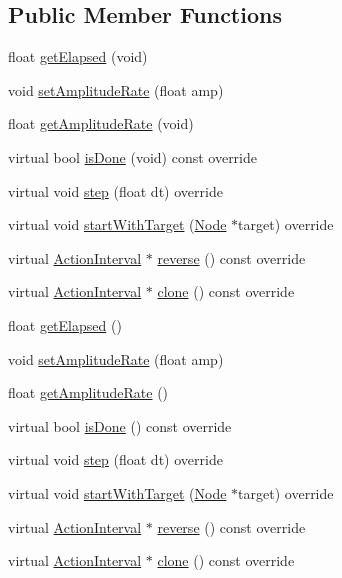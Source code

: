 \subsection*{Public Member Functions}
\begin{DoxyCompactItemize}
\item 
float \hyperlink{classActionInterval_ac4c654318b41a008364a93955a791b96}{get\+Elapsed} (void)
\item 
void \hyperlink{classActionInterval_a08c4d7dd0e8e3fb5e6b6684c6e1d86df}{set\+Amplitude\+Rate} (float amp)
\item 
float \hyperlink{classActionInterval_a376d54a39aef69cb640879c5ce1d589d}{get\+Amplitude\+Rate} (void)
\item 
virtual bool \hyperlink{classActionInterval_a466ff6a3a5f95e47d4d01bfa4775290d}{is\+Done} (void) const override
\item 
virtual void \hyperlink{classActionInterval_a9a520f0c4bd2d5b92e7f355bccd6f5cf}{step} (float dt) override
\item 
virtual void \hyperlink{classActionInterval_ad3d91186b2c3108488ddbbdbbd982484}{start\+With\+Target} (\hyperlink{classNode}{Node} $\ast$target) override
\item 
virtual \hyperlink{classActionInterval}{Action\+Interval} $\ast$ \hyperlink{classActionInterval_a9f9ac7164036a0bc261a72f62a2b2da7}{reverse} () const override
\item 
virtual \hyperlink{classActionInterval}{Action\+Interval} $\ast$ \hyperlink{classActionInterval_abc93ce0c2f54a90eb216a7803f25f44a}{clone} () const override
\item 
float \hyperlink{classActionInterval_acc73648af87e0c9c7c64daf266448bdb}{get\+Elapsed} ()
\item 
void \hyperlink{classActionInterval_a08c4d7dd0e8e3fb5e6b6684c6e1d86df}{set\+Amplitude\+Rate} (float amp)
\item 
float \hyperlink{classActionInterval_a35494f8c4076e716d7bcd66cf0b46c93}{get\+Amplitude\+Rate} ()
\item 
virtual bool \hyperlink{classActionInterval_a2a62feefec443d8a99c644fd5f3a5d7e}{is\+Done} () const override
\item 
virtual void \hyperlink{classActionInterval_af31c89d43ca311f700b66f6b4fa1f362}{step} (float dt) override
\item 
virtual void \hyperlink{classActionInterval_aa3cff2a0fbd0935ca00e38a46b7bd878}{start\+With\+Target} (\hyperlink{classNode}{Node} $\ast$target) override
\item 
virtual \hyperlink{classActionInterval}{Action\+Interval} $\ast$ \hyperlink{classActionInterval_a9f9ac7164036a0bc261a72f62a2b2da7}{reverse} () const override
\item 
virtual \hyperlink{classActionInterval}{Action\+Interval} $\ast$ \hyperlink{classActionInterval_abc93ce0c2f54a90eb216a7803f25f44a}{clone} () const override
\end{DoxyCompactItemize}
